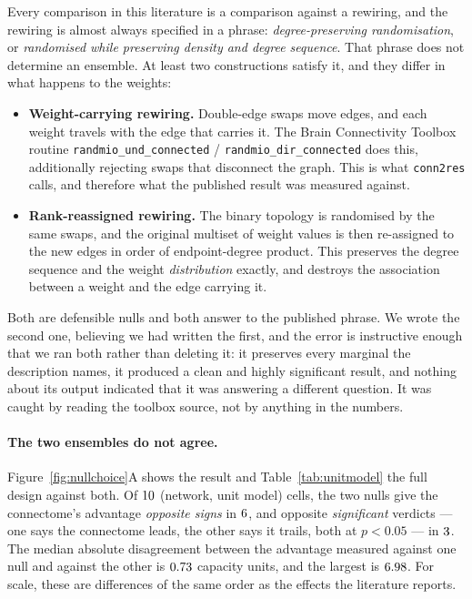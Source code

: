 

Every comparison in this literature is a comparison against a rewiring, and the rewiring
is almost always specified in a phrase: \emph{degree-preserving randomisation}, or
\emph{randomised while preserving density and degree sequence}. That phrase does not
determine an ensemble. At least two constructions satisfy it, and they differ in what
happens to the weights:

\begin{itemize}[leftmargin=1.2em,itemsep=2pt,topsep=3pt]
\item \textbf{Weight-carrying rewiring.} Double-edge swaps move edges, and each weight
travels with the edge that carries it. The Brain Connectivity Toolbox routine
\texttt{randmio\_und\_connected} / \texttt{randmio\_dir\_connected}
\cite{rubinov2010complex,maslov2002specificity} does this, additionally rejecting swaps
that disconnect the graph. This is what \texttt{conn2res} calls, and therefore what the
published result was measured against.
\item \textbf{Rank-reassigned rewiring.} The binary topology is randomised by the same
swaps, and the original multiset of weight values is then re-assigned to the new edges in
order of endpoint-degree product. This preserves the degree sequence and the weight
\emph{distribution} exactly, and destroys the association between a weight and the edge
carrying it.
\end{itemize}

Both are defensible nulls and both answer to the published phrase. We wrote the second
one, believing we had written the first, and the error is instructive enough that we ran
both rather than deleting it: it preserves every marginal the description names, it
produced a clean and highly significant result, and nothing about its output indicated
that it was answering a different question. It was caught by reading the toolbox source,
not by anything in the numbers.

\paragraph{The two ensembles do not agree.}
Figure~\ref{fig:nullchoice}A shows the result and Table~\ref{tab:unitmodel} the full
design against both. Of $10$ (network,
unit model) cells, the two nulls give the connectome's advantage \emph{opposite signs} in
$6$, and opposite \emph{significant} verdicts --- one says the connectome
leads, the other says it trails, both at $p < 0.05$ --- in $3$. The median
absolute disagreement between the advantage measured against one null and against the
other is $0.73$ capacity units, and the largest is $6.98$. For
scale, these are differences of the same order as the effects the literature reports.

